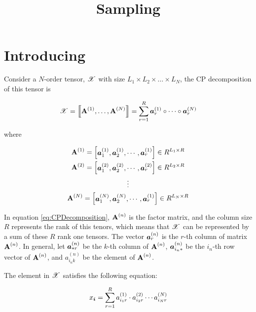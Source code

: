 \documentclass{article}
\newcommand{\Sca}[3]{{#1}^{(#2)}_{i_#2#3}}%
\newcommand{\T}[1]{\boldsymbol{\mathscr{\MakeUppercase{#1}}}}%
\newcommand{\V}[1]{{\bm{{\MakeLowercase{#1}}}}}%
\newcommand{\VnC}[3]{\V{#1}^{(#2)}_{#3}}%
\newcommand{\Varow}[1]{\V{a}^{(#1)}_{i_#1*}}
\newcommand{\Vacol}[1]{\V{a}^{(#1)}_{*r}}
\newcommand{\M}[1]{{\bm{\mathbf{\MakeUppercase{#1}}}}}%
\newcommand{\Mn}[2]{\M{#1}^{(#2)}}%
\newcommand{\KT}[1]{\left\llbracket #1 \right\rrbracket}
\begin{document}
\title{Sampling}
\date{}
\author{}
\maketitle



\section{Introducing}
Consider a $N$-order tensor, $\T{X}$ with size $L_1\times L_2\times\ldots\times L_N$, the CP decomposition of this tensor is

\begin{equation}\label{eq:CPDecomposition}
\T{X}= \KT{ \Mn{A}{1},\dots,\Mn{A}{N}} =
\sum_{r=1}^{R}\VnC{A}{1}{r} \circ \cdots \circ \VnC{A}{N}{r}
\end{equation}

where

\begin{gather*}\label{eq:ColumnVectorsForm}
\M{A}^{(1)} =
\begin{bmatrix}\VnC{a}{1}{1},\VnC{a}{1}{2},\cdots,\VnC{a}{1}{r}\end{bmatrix}\in R^{L_1\times R}\\
\M{A}^{(2)} =
\begin{bmatrix}\VnC{a}{2}{1},\VnC{a}{2}{2},\cdots,\VnC{a}{2}{r}\end{bmatrix}\in R^{L_2\times R}\\
\vdots\\
\M{A}^{(N)} =
\begin{bmatrix}\VnC{a}{N}{1},\VnC{a}{N}{2},\cdots,\VnC{a}{1}{r}\end{bmatrix}\in R^{L_N\times R}\\
\end{gather*}

In equation \ref{eq:CPDecomposition}, $\M{A}^{(n)}$ is the factor matrix, and the column size $R$ represents the rank of this tenors, which means that $\T{X}$ can be represented by a sum of these $R$ rank one tensors. The vector $\VnC{a}{n}{r}$ is the $r$-th column of matrix $\Mn{A}{n}$.
In general, let $\Vacol{n}$ be the $k$-th column of $\M{A}^{(n)}$, $\Varow{n}$ be the $i_n$-th row vector of $\M{A}^{(n)}$, and $\Sca{a}{n}{k}$ be the element of $\M{A}^{(n)}$.

The element in $\T{X}$ satisfies the following equation:

\begin{equation}\label{eq:ValueInTensor}
x_\V{i} = \sum_{r=1}^{R}\Sca{a}{1}{r}\cdot\Sca{a}{2}{r}\cdots\Sca{a}{N}{r}
\end{equation}
\end{document}
